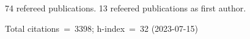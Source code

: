 74 refereed publications. 13 refeered publications as first author.

Total citations~=~3398; h-index~=~32 (2023-07-15)